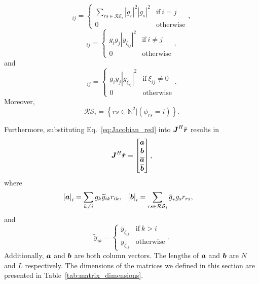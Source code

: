 \documentclass[useAMS,usenatbib]{mn2e}
\newcommand{\bE}{\bmath{E}}
\newcommand{\bF}{\bmath{F}}
\newcommand{\br}{\bmath{r}}
\newcommand{\bJ}{\bmath{J}}
\newcommand{\ba}{\bmath{a}}
\newcommand{\bb}{\bmath{b}}
\newcommand{\conj}[1]{\overline{#1}}
\begin{document}
\begin{equation}
[\bE]_{ij} = 
\begin{cases}
 \sum_{rs \in \mathcal{RS}_i} \left | g_r \right |^2 \left | g_s \right |^2  & \textrm{if} ~ i=j\\
 0 & \textrm{otherwise}
\end{cases},
\end{equation}
\begin{equation}
[\bF]_{ij} = 
\begin{cases}
 g_i g_j  \left | y_{\zeta_{ij}} \right |^2  & \textrm{if} ~ i \neq j\\
 0 & \textrm{otherwise}
\end{cases},
\end{equation}
and
\begin{equation}
[\boldsymbol{G}]_{ij} = 
\begin{cases}
 g_i y_j  \left | g_{\xi_{ij}} \right |^2  & \textrm{if} ~ \xi_{ij}\neq0\\
 0 & \textrm{otherwise}
\end{cases}.
\end{equation}
Moreover, 
\begin{equation}
\mathcal{RS}_i = \left\{rs\in\mathbb{N}^2|(\phi_{rs} = i) \right\}.
\end{equation}

Furthermore, substituting Eq.~\eqref{eq:Jacobian_red} into $\bJ^H\breve{\br}$ results in
\begin{equation}
\bJ^H\breve{\br} = \begin{bmatrix}
                   \ba \\
                   \bb \\
                   \conj{\ba}\\
                   \conj{\bb}
                   \end{bmatrix},
\end{equation}
where
\begin{align}
\label{eq:ab}
\left [ \ba \right ]_i &= \sum_{k\neq i} g_k \widetilde{y}_{ik}r_{ik},  & \left [ \bb \right ]_i &= \sum_{rs\in\mathcal{RS}_i}\conj{g}_r g_s r_{rs},
\end{align}
and
\begin{equation}
\widetilde{y}_{ik} = 
\begin{cases}
\conj{y}_{\zeta_{ik}} & \textrm{if}~k > i\\
y_{\zeta_{ik}} & \textrm{otherwise}
\end{cases}.
\end{equation}
Additionally, $\ba$ and $\bb$ are both column vectors. The lengths of $\ba$ and $\bb$ are $N$ and $L$ respectively.
The dimensions of the matrices we defined in this section are presented in Table~\ref{tab:matrix_dimensions}.
\end{document}
